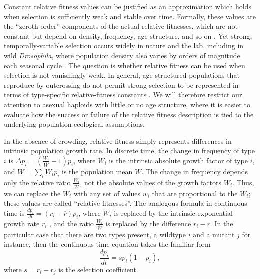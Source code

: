 \documentclass[12pt]{article}
\begin{document}
Constant relative fitness values can be justified as an approximation which holds when selection is sufficiently weak and stable over time. Formally, these values are the ``zeroth order'' components of the actual relative fitnesses, which are not constant but depend on density, frequency, age structure, and so on \cite[pp. 277]{ewens_2004} \citep[Chap. 4]{charlesworth_1994}. Yet strong, temporally-variable selection occurs widely in nature and the lab, including in wild \textit{Drosophila}, where population density also varies by orders of magnitude each seasonal cycle \citep{messer_2016,bergland_14}. The question is whether relative fitness can be used when selection is not vanishingly weak. In general, age-structured populations that reproduce by outcrossing do not permit strong selection to be represented in terms of type-specific relative-fitness constants \citep[Chap. 4]{charlesworth_1994}. We will therefore restrict our attention to asexual haploids with little or no age structure, where it is easier to evaluate how the success or failure of the relative fitness description is tied to the underlying population ecological assumptions. 

In the absence of crowding, relative fitness simply represents differences in intrinsic population growth rate. In discrete time, the change in frequency of type $i$ is $\Delta p_i=\left(\frac{W_i}{\overline{W}}-1\right) p_i$, where $W_i$ is the intrinsic absolute growth factor of type $i$, and $\overline{W}=\sum_i W_i p_i$ is the population mean $W$. The change in frequency depends only the relative ratio $\frac{W_i}{\overline{W}}$, not the absolute values of the growth factors $W_i$. Thus, we can replace the $W_i$ with any set of values $w_i$ that are proportional to the $W_i$; these values are called ``relative fitnesses''. The analogous formula in continuous time is $\frac{d p_i}{dt}=(r_i-\overline{r}) p_i$, where $W_i$ is replaced by the intrinsic exponential growth rate $r_i$ \citep[pp. 26]{crow_1970}, and the ratio $\frac{W_i}{\overline{W}}$ is replaced by the difference $r_i-\overline{r}$. In the particular case that there are two types present, a wildtype $i$ and a mutant $j$ for instance, then the continuous time equation takes the familiar form
\begin{equation}
\frac{d p_i}{dt}=s p_i(1-p_i), \label{eq:canonical}
\end{equation}
where $s=r_i-r_j$ is the selection coefficient. 
\end{document}
